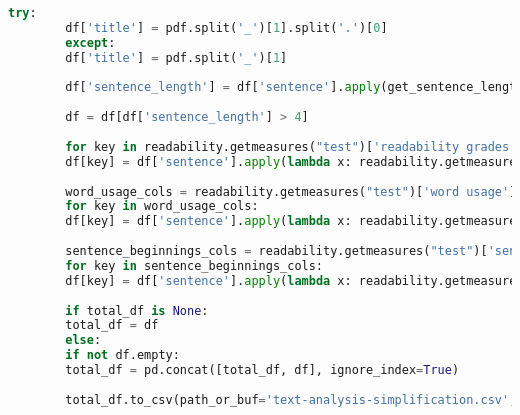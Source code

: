 \begin{center}
\begin{lstlisting}[language=Python, caption={Script voor text-analyse met Readability}, label={code:script-for-text-analysis}]
		try:
		df['title'] = pdf.split('_')[1].split('.')[0]
		except:
		df['title'] = pdf.split('_')[1]
		
		df['sentence_length'] = df['sentence'].apply(get_sentence_length)
		
		df = df[df['sentence_length'] > 4]   
		
		for key in readability.getmeasures("test")['readability grades'].keys():
		df[key] = df['sentence'].apply(lambda x: readability.getmeasures(x)['readability grades'][key])
		
		word_usage_cols = readability.getmeasures("test")['word usage'].keys()
		for key in word_usage_cols:
		df[key] = df['sentence'].apply(lambda x: readability.getmeasures(x, lang=lang)['word usage'][key])
		
		sentence_beginnings_cols = readability.getmeasures("test")['sentence beginnings'].keys()
		for key in sentence_beginnings_cols:
		df[key] = df['sentence'].apply(lambda x: readability.getmeasures(x, lang=lang)['sentence beginnings'][key])
		
		if total_df is None:
		total_df = df
		else:
		if not df.empty:
		total_df = pd.concat([total_df, df], ignore_index=True)
		
		total_df.to_csv(path_or_buf='text-analysis-simplification.csv', index=False)
	\end{lstlisting}
\end{center}
